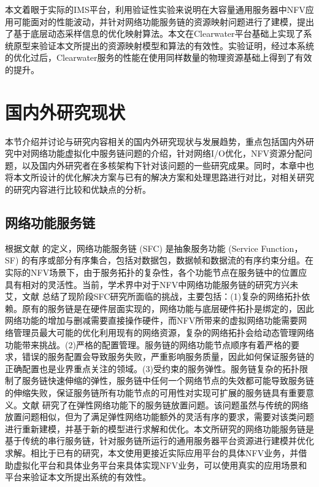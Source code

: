 本文着眼于实际的IMS平台，利用验证性实验来说明在大容量通用服务器中NFV应用可能面对的性能波动，并针对网络功能服务链的资源映射问题进行了建模，提出了基于底层动态采样信息的优化映射算法。本文在Clearwater平台基础上实现了系统原型来验证本文所提出的资源映射模型和算法的有效性。实验证明，经过本系统的优化过后，Clearwater服务的性能在使用同样数量的物理资源基础上得到了有效的提升。


\section{国内外研究现状}
\label{intro:research}
本节介绍并讨论与研究内容相关的国内外研究现状与发展趋势，重点包括国内外研究中对网络功能虚拟化中服务链问题的介绍，针对网络I/O优化，NFV资源分配问题，以及国内外研究者在多核架构下针对该问题的一些研究成果。同时，本章中也将本文所设计的优化解决方案与已有的解决方案和处理思路进行对比，对相关研究的研究内容进行比较和优缺点的分析。

\subsection{网络功能服务链}
根据文献  的定义，网络功能服务链 (SFC) 是抽象服务功能 (Service Function，SF) 的有序或部分有序集合，包括对数据包，数据帧和数据流的有序约束分组。在实际的NFV场景下，由于服务拓扑的复杂性，各个功能节点在服务链中的位置应具有相对的灵活性。当前，学术界中对于NFV中网络功能服务链的研究方兴未艾，文献  总结了现阶段SFC研究所面临的挑战，主要包括：(1)复杂的网络拓扑依赖。原有的服务链是在硬件层面实现的，网络功能与底层硬件拓扑是绑定的，因此网络功能的增加与删减需要直接操作硬件，而NFV所带来的虚拟网络功能需要网络管理员最大可能的优化利用现有的网络资源，复杂的网络拓扑会给动态管理网络功能带来挑战。(2)严格的配置管理。服务链的网络功能节点顺序有着严格的要求，错误的服务配置会导致服务失败，严重影响服务质量，因此如何保证服务链的正确配置也是业界重点关注的领域。(3)受约束的服务弹性。服务链复杂的拓扑限制了服务链快速伸缩的弹性，服务链中任何一个网络节点的失效都可能导致服务链的伸缩失败，保证服务链所有功能节点的可用性对实现可扩展的服务链具有重要意义。文献  研究了在弹性网络功能下的服务链放置问题。该问题虽然与传统的网络放置问题相似，但为了满足弹性网络功能额外的灵活有序的要求，需要对该类问题进行重新建模，并基于新的模型进行求解和优化。本文所研究的网络功能服务链是基于传统的串行服务链，针对服务链所运行的通用服务器平台资源进行建模并优化求解。相比于已有的研究，本文使用更接近实际应用平台的具体NFV业务，并借助虚拟化平台和具体业务平台来具体实现NFV业务，可以使用真实的应用场景和平台来验证本文所提出系统的有效性。

